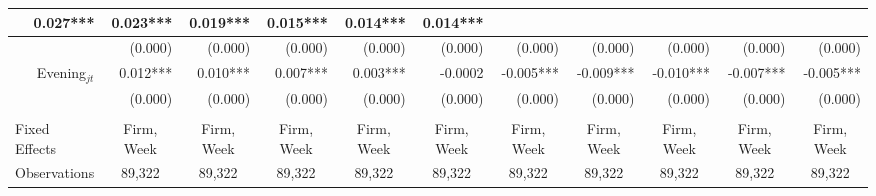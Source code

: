 \begin{table}
{\begin{tabular}{rrrrrrrrrrr}
  \multicolumn{1}{r|}{0.027***} &
  \multicolumn{1}{r|}{0.023***} &
  \multicolumn{1}{r|}{0.019***} &
  \multicolumn{1}{r|}{0.015***} &
  \multicolumn{1}{r|}{0.014***} &
  \multicolumn{1}{r|}{0.014***} \\ \hline
\multicolumn{1}{|r|}{} &
  \multicolumn{1}{r|}{(0.000)} &
  \multicolumn{1}{r|}{(0.000)} &
  \multicolumn{1}{r|}{(0.000)} &
  \multicolumn{1}{r|}{(0.000)} &
  \multicolumn{1}{r|}{(0.000)} &
  \multicolumn{1}{r|}{(0.000)} &
  \multicolumn{1}{r|}{(0.000)} &
  \multicolumn{1}{r|}{(0.000)} &
  \multicolumn{1}{r|}{(0.000)} &
  \multicolumn{1}{r|}{(0.000)} \\ \hline
\multicolumn{1}{|r|}{Evening$_{jt}$} &
  \multicolumn{1}{r|}{0.012***} &
  \multicolumn{1}{r|}{0.010***} &
  \multicolumn{1}{r|}{0.007***} &
  \multicolumn{1}{r|}{0.003***} &
  \multicolumn{1}{r|}{-0.0002} &
  \multicolumn{1}{r|}{-0.005***} &
  \multicolumn{1}{r|}{-0.009***} &
  \multicolumn{1}{r|}{-0.010***} &
  \multicolumn{1}{r|}{-0.007***} &
  \multicolumn{1}{r|}{-0.005***} \\ \hline
\multicolumn{1}{|r|}{} &
  \multicolumn{1}{r|}{(0.000)} &
  \multicolumn{1}{r|}{(0.000)} &
  \multicolumn{1}{r|}{(0.000)} &
  \multicolumn{1}{r|}{(0.000)} &
  \multicolumn{1}{r|}{(0.000)} &
  \multicolumn{1}{r|}{(0.000)} &
  \multicolumn{1}{r|}{(0.000)} &
  \multicolumn{1}{r|}{(0.000)} &
  \multicolumn{1}{r|}{(0.000)} &
  \multicolumn{1}{r|}{(0.000)} \\ \hline
\multicolumn{1}{l}{} &
  \multicolumn{1}{l}{} &
  \multicolumn{1}{l}{} &
  \multicolumn{1}{l}{} &
  \multicolumn{1}{l}{} &
  \multicolumn{1}{l}{} &
  \multicolumn{1}{l}{} &
  \multicolumn{1}{l}{} &
  \multicolumn{1}{l}{} &
  \multicolumn{1}{l}{} &
  \multicolumn{1}{l}{} \\ \hline
\multicolumn{1}{|l|}{Fixed Effects} &
  \multicolumn{1}{c|}{Firm, Week} &
  \multicolumn{1}{c|}{Firm, Week} &
  \multicolumn{1}{c|}{Firm, Week} &
  \multicolumn{1}{c|}{Firm, Week} &
  \multicolumn{1}{c|}{Firm, Week} &
  \multicolumn{1}{c|}{Firm, Week} &
  \multicolumn{1}{c|}{Firm, Week} &
  \multicolumn{1}{c|}{Firm, Week} &
  \multicolumn{1}{c|}{Firm, Week} &
  \multicolumn{1}{c|}{Firm, Week} \\ \hline
\multicolumn{1}{|l|}{Observations} &
  \multicolumn{1}{c|}{89,322} &
  \multicolumn{1}{c|}{89,322} &
  \multicolumn{1}{c|}{89,322} &
  \multicolumn{1}{c|}{89,322} &
  \multicolumn{1}{c|}{89,322} &
  \multicolumn{1}{c|}{89,322} &
  \multicolumn{1}{c|}{89,322} &
  \multicolumn{1}{c|}{89,322} &
  \multicolumn{1}{c|}{89,322} &
  \multicolumn{1}{c|}{89,322} \\ \hline

\end{tabular}}
\end{table}
